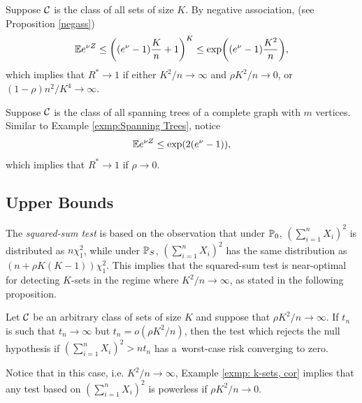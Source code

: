 \documentclass[10pt, oneside]{article}
\begin{document}
\begin{exmp}
  \label{exmp: k-sets, cor}
  Suppose ${\mathcal C}$ is the class of all sets of size $K$. By negative association, (see Proposition \ref{negass})
  \[
  \mathbb{E} e^{\nu Z} \le\biggl((e^\nu-1) \frac{K}{n}+1\biggr)^K
  \le\exp\biggl((e^\nu-1) \frac{K^2}{n}\biggr),
  \]
  which implies that $R^* \to1$ if either $K^2/n \to\infty$ and $\rho K^2/n \to0$, or $(1-\rho)n^2/K^4 \to\infty$.
\end{exmp}


\begin{exmp}
  Suppose ${\mathcal C}$ is the class of all spanning trees of a complete graph with $m$ vertices. Similar to Example \ref{exmp:Spanning Trees}, notice
  \[
  \mathbb{E} e^{\nu Z} \le \exp(2(e^\nu-1)),
  \]
  which implies that $R^* \to1$ if $\rho\to0$.
\end{exmp}


\subsection{Upper Bounds}

The \textit{squared-sum test} is based on the observation that under $\mathbb{P}_0$, $(\sum_{i=1}^n X_i)^2$ is distributed as $n
\chi_1^2$, while under $\mathbb{P}_S$, $(\sum_{i=1}^n X_i)^2$ has the same distribution
as $(n + \rho K(K-1)) \chi_1^2$. This implies that the squared-sum test is near-optimal for detecting
$K$-sets in the regime where $K^2/n \to\infty$, as stated in the following proposition.

\begin{prop}
\label{prpsq}
Let ${\mathcal C}$ be an arbitrary class of sets of size $K$ and suppose that $\rho K^2/n \to\infty$.
If $t_n$ is such that $t_n\to\infty$ but $t_n = o(\rho K^2/n)$, then the test which rejects the null hypothesis
if $(\sum_{i=1}^n X_i)^2 > n t_n$ has a~worst-case risk converging to zero.
\end{prop}
Notice that in this case, i.e. $K^2/n \to\infty$, Example \ref{exmp: k-sets, cor} implies that any test based on $(\sum_{i=1}^n X_i)^2$ is powerless if $\rho K^2/n \to0$.
\end{document}

